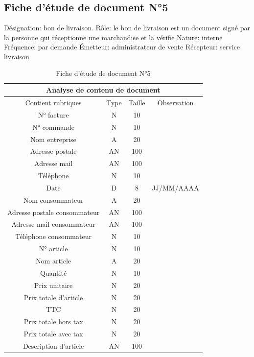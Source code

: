 \documentclass[edit,12pt,a4paper,ChapStyle,oneside,doubleinterligne]{report}
\begin{document}
\newpage
\subsection{Fiche d’étude de document N°5}
\noindent Désignation: bon de livraison.
\newline Rôle: le bon de livraison est un document signé par la personne qui réceptionne une marchandise et la vérifie
\newline Nature: interne
\newline Fréquence: par demande
\newline Émetteur: administrateur de vente
\newline Récepteur: service livraison \cite{bonl}
\begin{table}[h!]
    \centering
    \begin{tabular}{|c|c|c|c|}
         \hline
\multicolumn{4}{|c|}{Analyse de contenu de document}\\
\hline
Contient rubriques & Type & Taille & Observation\\
\hline
 N° facture  & N & 10 & \\
 N° commande  & N & 10 & \\
 Nom entreprise & A & 20 & \\
 Adresse postale & AN & 100 & \\
 Adresse mail & AN & 100 & \\
 Téléphone & N & 10 & \\
Date & D & 8 & JJ/MM/AAAA \\
Nom consommateur & A & 20 & \\
Adresse postale consommateur & AN & 100 & \\
Adresse mail consommateur & AN & 100 & \\
Téléphone consommateur & N & 10 & \\
N° article & N & 10 & \\
Nom article & A & 20 & \\
Quantité & N & 10 & \\
Prix unitaire & N & 20 & \\
Prix totale d’article & N & 20 & \\
TTC & N & 20 & \\
Prix totale hors tax & N & 20 & \\
Prix totale avec tax & N & 20 & \\
Description d’article & AN & 100 & \\
\hline
    \end{tabular}
    \caption{Fiche d’étude de document N°5}
    \label{tab:5}
\end{table}
\end{document}
